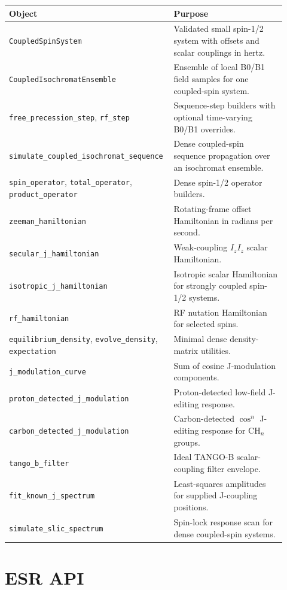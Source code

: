 \documentclass[11pt,oneside]{report}
\newcommand{\code}[1]{\texttt{#1}}
\begin{document}
\begin{longtable}{p{0.52\linewidth}p{0.40\linewidth}}
\toprule
Object & Purpose \\
\midrule
\code{CoupledSpinSystem} & Validated small spin-1/2 system with offsets and scalar couplings in hertz. \\
\code{CoupledIsochromatEnsemble} & Ensemble of local B0/B1 field samples for one coupled-spin system. \\
\code{free\_precession\_step}, \code{rf\_step} & Sequence-step builders with optional time-varying B0/B1 overrides. \\
\code{simulate\_coupled\_isochromat\_sequence} & Dense coupled-spin sequence propagation over an isochromat ensemble. \\
\code{spin\_operator}, \code{total\_operator}, \code{product\_operator} & Dense spin-1/2 operator builders. \\
\code{zeeman\_hamiltonian} & Rotating-frame offset Hamiltonian in radians per second. \\
\code{secular\_j\_hamiltonian} & Weak-coupling \(I_zI_z\) scalar Hamiltonian. \\
\code{isotropic\_j\_hamiltonian} & Isotropic scalar Hamiltonian for strongly coupled spin-1/2 systems. \\
\code{rf\_hamiltonian} & RF nutation Hamiltonian for selected spins. \\
\code{equilibrium\_density}, \code{evolve\_density}, \code{expectation} & Minimal dense density-matrix utilities. \\
\code{j\_modulation\_curve} & Sum of cosine J-modulation components. \\
\code{proton\_detected\_j\_modulation} & Proton-detected low-field J-editing response. \\
\code{carbon\_detected\_j\_modulation} & Carbon-detected \(\cos^n\) J-editing response for \(\mathrm{CH}_n\) groups. \\
\code{tango\_b\_filter} & Ideal TANGO-B scalar-coupling filter envelope. \\
\code{fit\_known\_j\_spectrum} & Least-squares amplitudes for supplied J-coupling positions. \\
\code{simulate\_slic\_spectrum} & Spin-lock response scan for dense coupled-spin systems. \\
\bottomrule
\end{longtable}

\section{ESR API}
\end{document}
